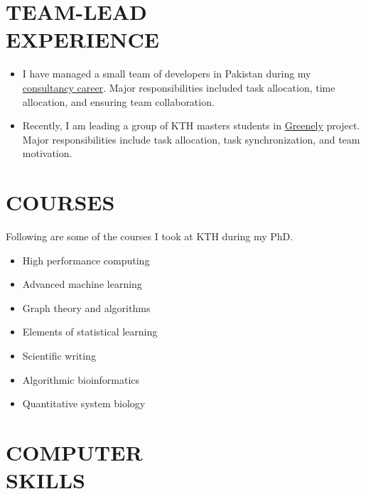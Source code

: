 \documentclass[margin, 10pt]{res} %
\begin{document}
\begin{resume}
\section{TEAM-LEAD \\ EXPERIENCE}
\begin{itemize}
\item I have managed a small team of developers in Pakistan during my \href{https://www.odesk.com/users/~013a228837c241737c}{consultancy career}. Major responsibilities included task allocation, time allocation, and ensuring team collaboration.
\item Recently, I am leading a group of KTH masters students in \href{https://www.youtube.com/watch?v=COsyhfX7Pes}{Greenely} project. Major responsibilities include task allocation, task synchronization, and team motivation.
\end{itemize}

\section{COURSES}

Following are some of the courses I took at KTH during my PhD. 
\begin{itemize}
\item High performance computing
\item Advanced machine learning
\item Graph theory and algorithms
\item Elements of statistical learning
\item Scientific writing
\item Algorithmic bioinformatics
\item Quantitative system biology
\end{itemize} 


\section{COMPUTER \\ SKILLS} 


\end{resume}
\end{document}
